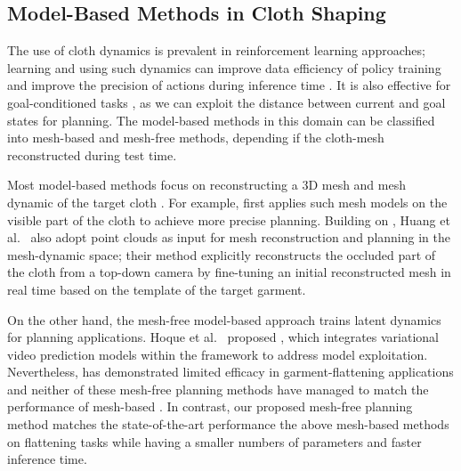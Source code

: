 \documentclass[journal]{IEEEtran}
\begin{document}
\subsection{Model-Based Methods in Cloth Shaping} \label{sec:mbrl}

The use of cloth dynamics is prevalent in reinforcement learning approaches; learning and using such dynamics can improve data efficiency of policy training and improve the precision of actions during inference time \cite{hafner2019learning, hafner2025mastering, kadi2024planet, lin2022learning}. It is also effective for goal-conditioned tasks \cite{duan2024learning, hoque2022visuospatial}, as we can exploit the distance between current and goal states for planning. The model-based methods in this domain can be classified into mesh-based and mesh-free methods, depending if the cloth-mesh reconstructed during test time.

Most model-based methods focus on reconstructing a 3D mesh and mesh dynamic of the target cloth \cite{huang2022mesh, lin2022learning, tian2025diffusion}. For example,  \cite{lin2022learning} first applies such mesh models  on the visible part of the cloth to achieve more precise planning. Building on , Huang et al.~\cite{huang2022mesh} also adopt point clouds as input for mesh reconstruction and planning in the mesh-dynamic space; their method   explicitly reconstructs the occluded part of the cloth from a top-down camera by fine-tuning an initial reconstructed mesh in real time based on the template of the target garment. 

On the other hand, the mesh-free model-based approach  \cite{yan2021learning} trains latent dynamics for planning applications. Hoque et al.~\cite{hoque2022visuospatial} proposed , which integrates variational video prediction models within the  framework \cite{ebert2018visual} to address model exploitation. Nevertheless,  has demonstrated limited efficacy in garment-flattening applications \cite{lin2022learning} and neither of these mesh-free planning methods have  managed to match the performance of mesh-based  \cite{lin2022learning}.  In contrast, our proposed mesh-free planning method  matches the state-of-the-art performance the above mesh-based methods on flattening tasks while having a smaller numbers of parameters and faster inference time.
\end{document}
